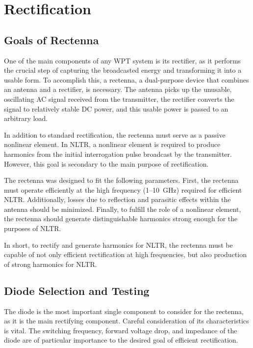 \chapter{Rectification}
\label{ch:rectenna}

\section{Goals of Rectenna}
\label{sec:rectenna-goals}

One of the main components of any WPT system is its rectifier, as it performs the crucial step of capturing the broadcasted energy and transforming it into a usable form. To accomplish this, a rectenna, a dual-purpose device that combines an antenna and a rectifier, is necessary. The antenna picks up the unusable, oscillating AC signal received from the transmitter, the rectifier converts the signal to relatively stable DC power, and this usable power is passed to an arbitrary load.

In addition to standard rectification, the rectenna must serve as a passive nonlinear element. In NLTR, a nonlinear element is required to produce harmonics from the initial interrogation pulse broadcast by the transmitter. However, this goal is secondary to the main purpose of rectification.

The rectenna was designed to fit the following parameters. First, the rectenna must operate efficiently at the high frequency (\numrange{1}{10}~GHz) required for efficient NLTR. Additionally, losses due to reflection and parasitic effects within the antenna should be minimized. Finally, to fulfill the role of a nonlinear element, the rectenna should generate distinguishable harmonics strong enough for the purposes of NLTR.

In short, to rectify and generate harmonics for NLTR, the rectenna must be capable of not only efficient rectification at high frequencies, but also production of strong harmonics for NLTR.

\section{Diode Selection and Testing}
\label{sec:rectenna-diode}

The diode is the most important single component to consider for the rectenna, as it is the main rectifying component. Careful consideration of its characteristics is vital. The switching frequency, forward voltage drop, and impedance of the diode are of particular importance to the desired goal of efficient rectification.

